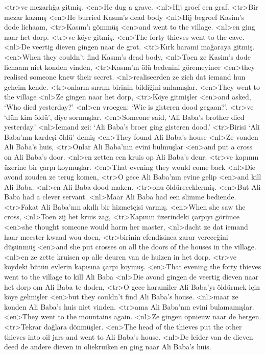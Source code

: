 <tr>ve mezarlığa gitmiş.
<en>He dug a grave.
<nl>Hij groef een graf. 
<tr>Bir mezar kazmış
<en>He burried Kasım’s dead body
<nl>Hij begroef Kasim's dode lichaam, 
<tr>Kasım’ı gömmüş
<en>and went to the village.
<nl>en ging naar het dorp.
<tr>ve köye gitmiş.
<en>The forty thieves went to the cave.
<nl>De veertig dieven gingen naar de grot. 
<tr>Kırk harami mağaraya gitmiş.
<en>When they couldn’t find Kasım’s dead body,
<nl>Toen ze Kasim's  dode lichaam niet konden vinden, 
<tr>Kasım’ın ölü bedenini göremeyince
<en>they realised someone knew their secret. 
<nl>realiseerden ze zich dat iemand hun geheim kende. 
<tr>onların sırrını birinin bildiğini anlamışlar. 
<en>They went to the village
<nl>Ze gingen naar het dorp, 
<tr>Köye gitmişler
<en>and asked, `Who died yesterday?'
<nl>en vroegen: `Wie is gisteren dood gegaan?'.
<tr>ve `dün kim öldü', diye sormuşlar.
<en>Someone said,  `Ali Baba’s brother died yesterday.'
<nl>Iemand zei: `Ali Baba's broer ging gisteren dood.' 
<tr>Birisi `Ali Baba’nın kardeşi öldü' demiş
<en>They found Ali Baba’s house
<nl>Ze vonden Ali Baba's huis, 
<tr>Onlar Ali Baba’nın evini bulmuşlar
<en>and put a cross on Ali Baba’s door.
<nl>en zetten een kruis op Ali Baba's deur. 
<tr>ve kapının üzerine bir çarpı koymuşlar.
<en>That evening they would come back
<nl>Die avond zouden ze terug komen, 
<tr>O gece Ali Baba’nın evine gelip
<en>and kill Ali Baba.
<nl>en Ali Baba dood maken. 
<tr>onu öldüreceklermiş.
<en>But Ali Baba had a clever servant.
<nl>Maar Ali Baba had een slimme bediende. 
<tr>Fakat Ali Baba’nın akıllı bir hizmetçisi varmış.
<en>When she saw the cross,
<nl>Toen zij het kruis zag, 
<tr>Kapının üzerindeki çarpıyı görünce
<en>she thought someone would harm her master,
<nl>dacht ze dat iemand haar meester kwaad wou doen, 
<tr>birinin efendisinea zarar vereceğini düşünmüş
<en>and she put crosses on all the doors of the houses in the village.
<nl>en ze zette kruisen op alle deuren van de huizen in het dorp. 
<tr>ve köydeki bütün evlerin kapısına çarpı koymuş.
<en>That evening the forty thieves went to the village to kill Ali Baba
<nl>Die avond gingen de veertig dieven naar het dorp om Ali Baba te doden, 
<tr>O gece haramiler Ali Baba’yı öldürmek için köye gelmişler
<en>but they couldn’t find Ali Baba’s house.
<nl>maar ze konden Ali Baba's huis niet vinden. 
<tr>ama Ali Baba’nın evini bulamamışlar.
<en>They went to the mountains again.
<nl>Ze gingen opnieuw naar de bergen. 
<tr>Tekrar dağlara  dönmüşler.
<en>The head of the thieves put the other thieves into oil jars and went to Ali Baba’s house.
<nl>De leider van de dieven deed de andere dieven in oliekruiken en ging naar Ali Baba's huis.
